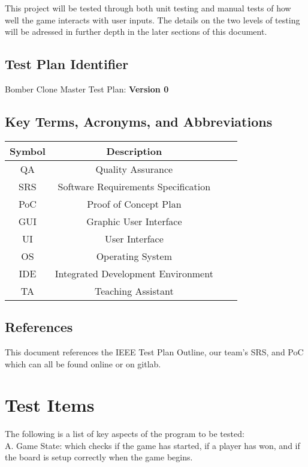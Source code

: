 \documentclass[12pt, letterpaper]{article}
\begin{document}
	This project will be tested through both unit testing and manual tests of how well the game interacts with user inputs. The details on the two levels of testing will be adressed in further depth in the later sections of this document.
	
	\subsection{Test Plan Identifier}
	Bomber Clone Master Test Plan: \textbf{Version 0}
	
	\subsection{Key Terms, Acronyms, and Abbreviations}

		\begin{tabular}{ |c|c|c|c| } 
			\hline
			\textbf{Symbol} & \textbf{Description} \\
			\hline
			QA & Quality Assurance\\ 
			SRS & Software Requirements Specification\\ 
			PoC & Proof of Concept Plan\\ 
			GUI & Graphic User Interface\\
			UI & User Interface\\
			OS & Operating System\\
			IDE & Integrated Development Environment\\
			TA & Teaching Assistant\\
			\hline
		\end{tabular}
	
	\subsection{References}
	\indent \indent This document references the IEEE Test Plan Outline, our team's SRS, and PoC which can all be found online or on gitlab.
	
	\section{Test Items}
	The following is a list of key aspects of the program to be tested:\\
	
	\noindent A. \indent Game State: which checks if the game has started, if a player has won, and if the board is setup correctly when the game begins.\\
	
\end{document}
